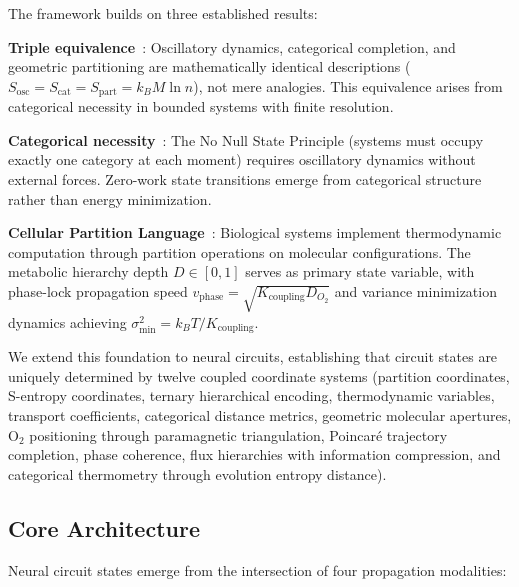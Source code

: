 \documentclass[aps,prd,twocolumn,superscriptaddress,floatfix,nofootinbib]{revtex4-2}
\theoremstyle{remark}
\begin{document}
The framework builds on three established results:

\textbf{Triple equivalence}~\cite{sachikonye2025partition}: Oscillatory dynamics, categorical completion, and geometric partitioning are mathematically identical descriptions ($S_{\text{osc}} = S_{\text{cat}} = S_{\text{part}} = k_B M \ln n$), not mere analogies. This equivalence arises from categorical necessity in bounded systems with finite resolution.

\textbf{Categorical necessity}~\cite{sachikonye2025partition}: The No Null State Principle (systems must occupy exactly one category at each moment) requires oscillatory dynamics without external forces. Zero-work state transitions emerge from categorical structure rather than energy minimization.

\textbf{Cellular Partition Language}~\cite{sachikonye2024cellular}: Biological systems implement thermodynamic computation through partition operations on molecular configurations. The metabolic hierarchy depth $D \in [0,1]$ serves as primary state variable, with phase-lock propagation speed $v_{\text{phase}} = \sqrt{K_{\text{coupling}} D_{O_2}}$ and variance minimization dynamics achieving $\sigma^2_{\text{min}} = k_B T / K_{\text{coupling}}$.

We extend this foundation to neural circuits, establishing that circuit states are uniquely determined by twelve coupled coordinate systems (partition coordinates, S-entropy coordinates, ternary hierarchical encoding, thermodynamic variables, transport coefficients, categorical distance metrics, geometric molecular apertures, O$_2$ positioning through paramagnetic triangulation, Poincaré trajectory completion, phase coherence, flux hierarchies with information compression, and categorical thermometry through evolution entropy distance).

\subsection{Core Architecture}

Neural circuit states emerge from the intersection of four propagation modalities:
\end{document}
